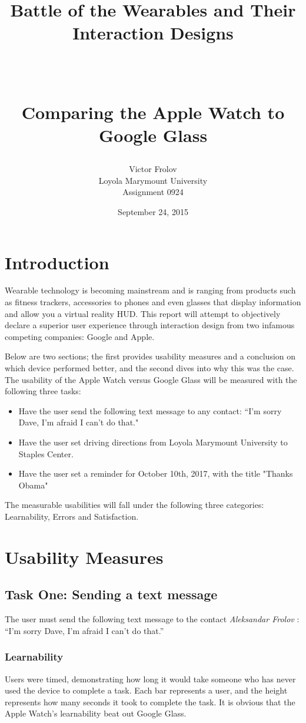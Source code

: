 \documentclass[paper=a4, fontsize=11pt]{scrartcl}	%
\title{ \vspace{-1in} 	\usefont{OT1}{bch}{b}{n}
		\huge \strut Battle of the Wearables and Their Interaction Designs \strut \\
		\Large \bfseries \strut Comparing the Apple Watch to Google Glass \strut
}
\author{ 									\usefont{OT1}{bch}{m}{n}
        Victor Frolov\\		\usefont{OT1}{bch}{m}{n}
        Loyola Marymount University\\	\usefont{OT1}{bch}{m}{n}
	Assignment 0924\\
}
\date{September 24, 2015}
\numberwithin{equation}{section}															%
\numberwithin{figure}{section}																%
\numberwithin{table}{section}																%
\begin{document}
\maketitle
\section{Introduction}
	Wearable technology is becoming mainstream and is ranging from products such as fitness trackers, accessories to phones and even glasses that display information and allow you a virtual reality HUD. This report will attempt to objectively declare a superior user experience through interaction design from two infamous competing companies: Google and Apple.

	Below are two sections; the first provides usability measures and a conclusion on which device performed better, and the second dives into why this was the case. The usability of the  Apple Watch versus Google Glass will be measured with the following three tasks: 

\begin{itemize}
	\item Have the user send the following text message to any contact: ``I'm sorry Dave, I'm afraid I can't do that."
	\item Have the user set driving directions from Loyola Marymount University to Staples Center.
	\item Have the user set  a reminder for October 10th, 2017, with the title "Thanks Obama"
\end{itemize}

The measurable usabilities will fall under the following three categories: Learnability, Errors and Satisfaction.


\section{Usability Measures}
\subsection{Task One: Sending a text message}
The user must send the following text message to the contact \textit{Aleksandar Frolov} : ``I'm sorry Dave, I'm afraid I can't do that.''


\subsubsection{Learnability}

Users were timed, demonstrating how long it would take someone who has never used the device to complete a task. Each bar represents a user, and the height represents how many seconds it took to complete the task. It is obvious that the Apple Watch's learnability beat out Google Glass.
\end{document}
